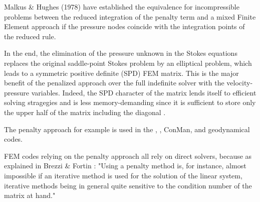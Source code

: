 Malkus \& Hughes (1978) \cite{mahu78} have established the equivalence 
for incompressible problems between the reduced integration
of the penalty term and a mixed Finite Element approach if the pressure nodes coincide 
with the integration points of the reduced rule.

In the end, the elimination of the pressure unknown in the Stokes equations
replaces the original saddle-point Stokes problem \cite{begl05} by an elliptical problem, 
which leads to a symmetric positive definite (SPD) FEM matrix. 
This is the major benefit of the penalized approach 
over the full indefinite solver with the velocity-pressure variables. 
Indeed, the SPD character of the matrix lends itself 
to efficient solving stragegies and is less memory-demanding since it is sufficient to 
store only the upper half of the matrix including the diagonal \cite{gova}.

The penalty approach for example is used in the \sopale, \douar, ConMan, \fantom and \elefant geodynamical 
codes. 

\begin{remark}
FEM codes relying on the penalty approach all rely on direct solvers, because as explained in 
Brezzi \& Fortin \cite{brfo}: "Using a penalty method is, for instance, almost impossible if an iterative
method is used for the solution of the linear system, iterative methods
being in general quite sensitive to the condition number of the matrix at hand."
\end{remark}



